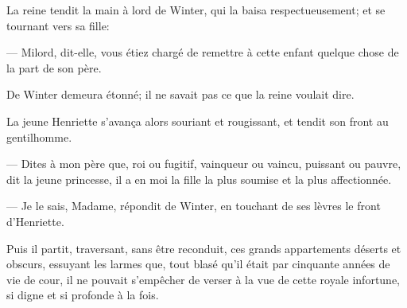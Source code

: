 La reine tendit la main à lord de Winter, qui la baisa respectueusement; et se tournant vers sa fille:

— Milord, dit-elle, vous étiez chargé de remettre à cette enfant quelque chose de la part de son père.

De Winter demeura étonné; il ne savait pas ce que la reine voulait dire.

La jeune Henriette s'avança alors souriant et rougissant, et tendit son front au gentilhomme.

— Dites à mon père que, roi ou fugitif, vainqueur ou vaincu, puissant ou pauvre, dit la jeune princesse, il a en moi la fille la plus soumise et la plus affectionnée.

— Je le sais, Madame, répondit de Winter, en touchant de ses lèvres le front d'Henriette.

Puis il partit, traversant, sans être reconduit, ces grands appartements déserts et obscurs, essuyant les larmes que, tout blasé qu'il était par cinquante années de vie de cour, il ne pouvait s'empêcher de verser à la vue de cette royale infortune, si digne et si profonde à la fois.